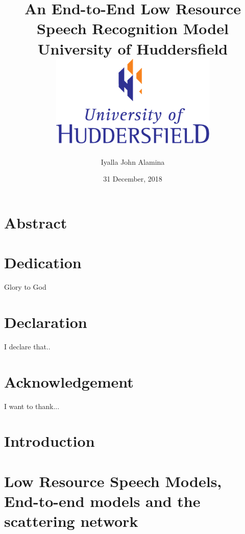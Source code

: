 \documentclass[12pt,twoside]{report}
\title{
    {An End-to-End Low Resource Speech Recognition Model}\\
    {\large University of Huddersfield}\\
    {\includegraphics{university.png}}
}
\author{Iyalla John Alamina}
\date{31 December, 2018}
\begin{document}
\maketitle
{}

\chapter*{Abstract}

\chapter*{Dedication}
Glory to God

\chapter*{Declaration}
I declare that..

\chapter*{Acknowledgement}
I want to thank...

\tableofcontents

\chapter{Introduction}


\chapter{Low Resource Speech Models, End-to-end models and the scattering network}





\end{document}
